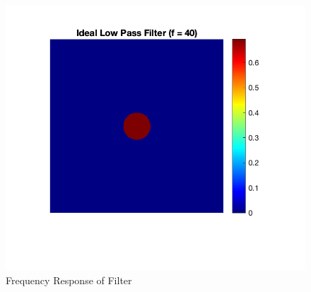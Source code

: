 \documentclass[12pt]{article}
\begin{document}
\begin{figure}[H]
    \centering
    \includegraphics{../images/ideal_LPF_40.png}
    \caption{Frequency Response of Filter}
\end{figure}
\end{document}
